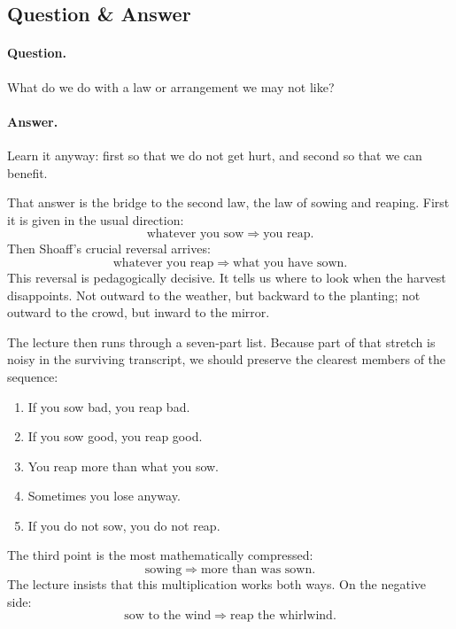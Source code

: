 \subsection{Question \& Answer}

\paragraph{Question.} What do we do with a law or arrangement we may not like?

\paragraph{Answer.} Learn it anyway: first so that we do not get hurt, and second so that we can benefit.

That answer is the bridge to the second law, the law of sowing and reaping. First it is given in the usual direction:
\begin{equation}
\text{whatever you sow} \Rightarrow \text{you reap}.
\end{equation}
Then Shoaff's crucial reversal arrives:
\begin{equation}
\text{whatever you reap} \Rightarrow \text{what you have sown}.
\end{equation}
This reversal is pedagogically decisive. It tells us where to look when the harvest disappoints. Not outward to the weather, but backward to the planting; not outward to the crowd, but inward to the mirror.

The lecture then runs through a seven-part list. Because part of that stretch is noisy in the surviving transcript, we should preserve the clearest members of the sequence:
\begin{enumerate}
\item If you sow bad, you reap bad.
\item If you sow good, you reap good.
\item You reap more than what you sow.
\item Sometimes you lose anyway.
\item If you do not sow, you do not reap.
\end{enumerate}

The third point is the most mathematically compressed:
\begin{equation}
\text{sowing} \Rightarrow \text{more than was sown}.
\end{equation}
The lecture insists that this multiplication works both ways. On the negative side:
\begin{equation}
\text{sow to the wind} \Rightarrow \text{reap the whirlwind}.
\end{equation}

